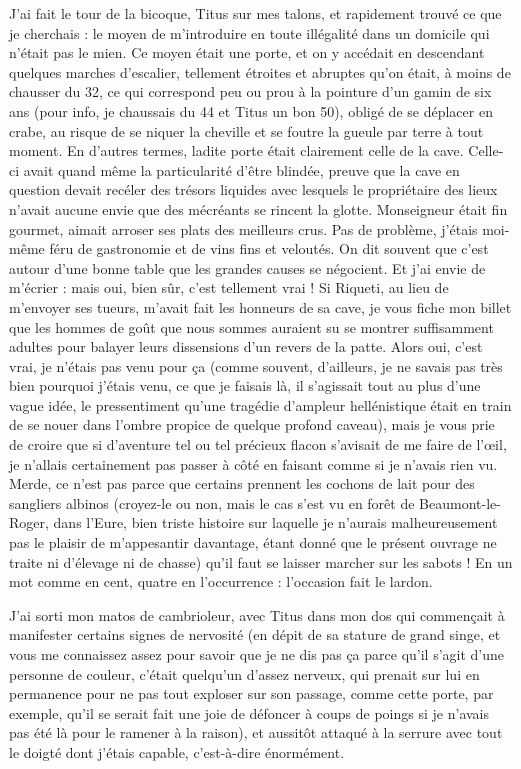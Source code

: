 J’ai fait le tour de la bicoque, Titus sur mes talons, et rapidement trouvé ce que je cherchais : le moyen de m’introduire en toute illégalité dans un domicile qui n’était pas le mien. Ce moyen était une porte, et on y accédait en descendant quelques marches d’escalier, tellement étroites et abruptes qu’on était, à moins de chausser du 32, ce qui correspond peu ou prou à la pointure d’un gamin de six ans (pour info, je chaussais du 44 et Titus un bon 50), obligé de se déplacer en crabe, au risque de se niquer la cheville et se foutre la gueule par terre à tout moment. En d’autres termes, ladite porte était clairement celle de la cave. Celle-ci avait quand même la particularité d’être blindée, preuve que la cave en question devait recéler des trésors liquides avec lesquels le propriétaire des lieux n’avait aucune envie que des mécréants se rincent la glotte. Monseigneur était fin gourmet, aimait arroser ses plats des meilleurs crus. Pas de problème, j’étais moi-même féru de gastronomie et de vins fins et veloutés. On dit souvent que c’est autour d’une bonne table que les grandes causes se négocient. Et j’ai envie de m’écrier : mais oui, bien sûr, c’est tellement vrai ! Si Riqueti, au lieu de m’envoyer ses tueurs, m’avait fait les honneurs de sa cave, je vous fiche mon billet que les hommes de goût que nous sommes auraient su se montrer suffisamment adultes pour balayer leurs dissensions d’un revers de la patte. Alors oui, c’est vrai, je n’étais pas venu pour ça (comme souvent, d’ailleurs, je ne savais pas très bien pourquoi j’étais venu, ce que je faisais là, il s’agissait tout au plus d’une vague idée, le pressentiment qu’une tragédie d’ampleur hellénistique était en train de se nouer dans l’ombre propice de quelque profond caveau), mais je vous prie de croire que si d’aventure tel ou tel précieux flacon s’avisait de me faire de l’œil, je n’allais certainement pas passer à côté en faisant comme si je n’avais rien vu. Merde, ce n’est pas parce que certains prennent les cochons de lait pour des sangliers albinos (croyez-le ou non, mais le cas s’est vu en forêt de Beaumont-le-Roger, dans l’Eure, bien triste histoire sur laquelle je n’aurais malheureusement pas le plaisir de m’appesantir davantage, étant donné que le présent ouvrage ne traite ni d’élevage ni de chasse) qu’il faut se laisser marcher sur les sabots ! En un mot comme en cent, quatre en l’occurrence : l’occasion fait le lardon.

J’ai sorti mon matos de cambrioleur, avec Titus dans mon dos qui commençait à manifester certains signes de nervosité (en dépit de sa stature de grand singe, et vous me connaissez assez pour savoir que je ne dis pas ça parce qu’il s’agit d’une personne de couleur, c’était quelqu’un d’assez nerveux, qui prenait sur lui en permanence pour ne pas tout exploser sur son passage, comme cette porte, par exemple, qu’il se serait fait une joie de défoncer à coups de poings si je n’avais pas été là pour le ramener à la raison), et aussitôt attaqué à la serrure avec tout le doigté dont j’étais capable, c’est-à-dire énormément.


